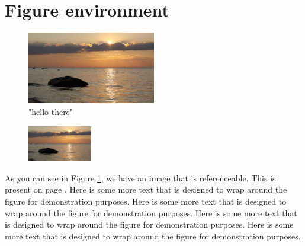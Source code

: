 \documentclass[12pt]{report}
\begin{document}
\section{Figure environment}

\begin{figure}[h]
    \centering %
    \includegraphics[width = 0.5\textwidth]{demo}
    \caption{"hello there"} %
    \label{fig:figure1} %
\end{figure}

\begin{figure} %
    \centering
    \includegraphics[width = 0.25\textwidth]{demo} %
\end{figure}

As you can see in Figure \ref{fig:figure1}, we have an image that is referenceable. This is present on page \pageref{fig:figure1}.  Here is some more text that is designed to wrap around the figure for demonstration purposes. Here is some more text that is designed to wrap around the figure for demonstration purposes. Here is some more text that is designed to wrap around the figure for demonstration purposes. Here is some more text that is designed to wrap around the figure for demonstration purposes. 
\end{document}
